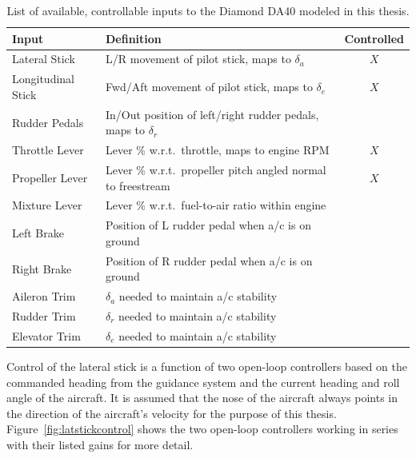 \begin{table}[!ht]
    \caption{List of available, controllable inputs to the Diamond DA40 modeled in this thesis.}\label{tbl:controls}
    \centering
    \begin{tabular}{llc}
        \toprule
        \textbf{Input}     & \textbf{Definition}                                               & \textbf{Controlled} \\
        \midrule
        Lateral Stick      & L/R movement of pilot stick, maps to \(\delta_a\)                 & \(X\)               \\
        Longitudinal Stick & Fwd/Aft movement of pilot stick, maps to \(\delta_e\)             & \(X\)               \\
        Rudder Pedals      & In/Out position of left/right rudder pedals, maps to \(\delta_r\) &                     \\
        Throttle Lever     & Lever \% w.r.t.\ throttle, maps to engine RPM                     & \(X\)               \\
        Propeller Lever    & Lever \% w.r.t.\ propeller pitch angled normal to freestream      & \(X\)               \\
        Mixture Lever      & Lever \% w.r.t.\ fuel-to-air ratio within engine                  &                     \\
        Left Brake         & Position of L rudder pedal when a/c is on ground                  &                     \\
        Right Brake        & Position of R rudder pedal when a/c is on ground                  &                     \\
        Aileron Trim       & \(\delta_a\) needed to maintain a/c stability                     &                     \\
        Rudder Trim        & \(\delta_r\) needed to maintain a/c stability                     &                     \\
        Elevator Trim      & \(\delta_e\) needed to maintain a/c stability                     &                     \\
        \bottomrule
    \end{tabular}
\end{table}

Control of the lateral stick is a function of two open-loop controllers based on the commanded heading from the guidance system and the current heading and roll angle of the aircraft. It is assumed that the nose of the aircraft always points in the direction of the aircraft's velocity for the purpose of this thesis. Figure~\ref{fig:latstickcontrol} shows the two open-loop controllers working in series with their listed gains for more detail.

